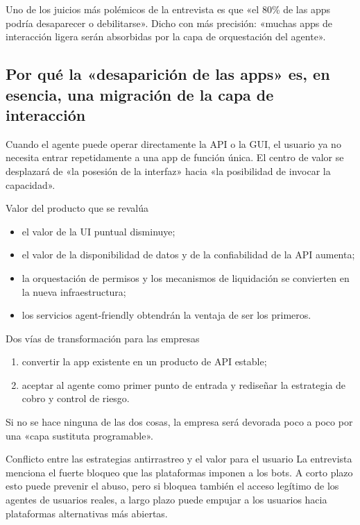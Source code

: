 \documentclass[a4paper]{article}
\begin{document}
Uno de los juicios más polémicos de la entrevista es que «el 80\% de las apps podría desaparecer o debilitarse». Dicho con más precisión: «muchas apps de interacción ligera serán absorbidas por la capa de orquestación del agente».

\subsection{Por qué la «desaparición de las apps» es, en esencia, una migración de la capa de interacción}

Cuando el agente puede operar directamente la API o la GUI, el usuario ya no necesita entrar repetidamente a una app de función única. El centro de valor se desplazará de «la posesión de la interfaz» hacia «la posibilidad de invocar la capacidad».

\begin{importantbox}{Valor del producto que se revalúa}
\begin{itemize}
    \item el valor de la UI puntual disminuye;
    \item el valor de la disponibilidad de datos y de la confiabilidad de la API aumenta;
    \item la orquestación de permisos y los mecanismos de liquidación se convierten en la nueva infraestructura;
    \item los servicios agent-friendly obtendrán la ventaja de ser los primeros.
\end{itemize}
\end{importantbox}

\begin{knowledgebox}{Dos vías de transformación para las empresas}
\begin{enumerate}
    \item convertir la app existente en un producto de API estable;
    \item aceptar al agente como primer punto de entrada y rediseñar la estrategia de cobro y control de riesgo.
\end{enumerate}
Si no se hace ninguna de las dos cosas, la empresa será devorada poco a poco por una «capa sustituta programable».
\end{knowledgebox}

\begin{warningbox}{Conflicto entre las estrategias antirrastreo y el valor para el usuario}
La entrevista menciona el fuerte bloqueo que las plataformas imponen a los bots. A corto plazo esto puede prevenir el abuso, pero si bloquea también el acceso legítimo de los agentes de usuarios reales, a largo plazo puede empujar a los usuarios hacia plataformas alternativas más abiertas.
\end{warningbox}
\end{document}
